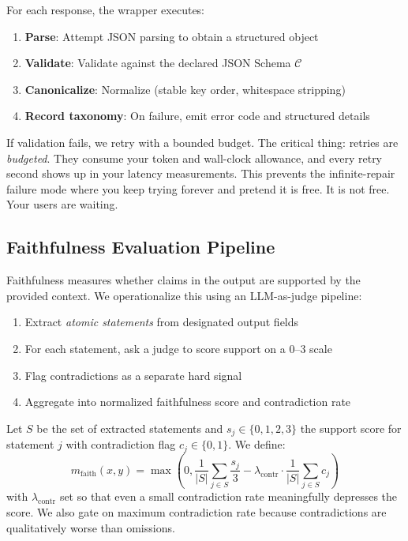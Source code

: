 \documentclass[11pt]{article}
\begin{document}
For each response, the wrapper executes:
\begin{enumerate}[leftmargin=12pt]
    \item \textbf{Parse}: Attempt JSON parsing to obtain a structured object
    \item \textbf{Validate}: Validate against the declared JSON Schema $\mathcal{C}$
    \item \textbf{Canonicalize}: Normalize (stable key order, whitespace stripping)
    \item \textbf{Record taxonomy}: On failure, emit error code and structured details
\end{enumerate}

If validation fails, we retry with a bounded budget.
The critical thing: retries are \emph{budgeted}.
They consume your token and wall-clock allowance, and every retry second shows up in your latency measurements.
This prevents the infinite-repair failure mode where you keep trying forever and pretend it is free.
It is not free.
Your users are waiting.

\subsection{Faithfulness Evaluation Pipeline}

Faithfulness measures whether claims in the output are supported by the provided context.
We operationalize this using an LLM-as-judge pipeline:

\begin{enumerate}[leftmargin=12pt]
    \item Extract \emph{atomic statements} from designated output fields
    \item For each statement, ask a judge to score support on a 0--3 scale
    \item Flag contradictions as a separate hard signal
    \item Aggregate into normalized faithfulness score and contradiction rate
\end{enumerate}

Let $S$ be the set of extracted statements and $s_j \in \{0,1,2,3\}$ the support score for statement $j$ with contradiction flag $c_j \in \{0,1\}$.
We define:
\[
m_{\text{faith}}(x,y) = \max\left(0, \frac{1}{|S|}\sum_{j \in S}\frac{s_j}{3} - \lambda_{\text{contr}} \cdot \frac{1}{|S|}\sum_{j \in S} c_j\right)
\]
with $\lambda_{\text{contr}}$ set so that even a small contradiction rate meaningfully depresses the score.
We also gate on maximum contradiction rate because contradictions are qualitatively worse than omissions.
\end{document}
